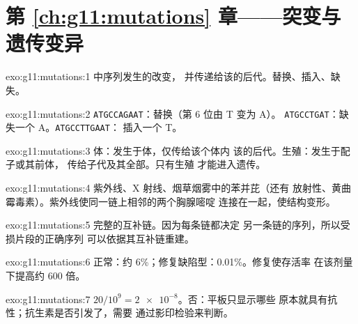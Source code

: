 \section*{第 \ref{ch:g11:mutations} 章——突变与遗传变异}

\begin{solution}{exo:g11:mutations:1}
 中序列发生的改变，
并传递给该的后代。替换、插入、缺失。
\end{solution}

\begin{solution}{exo:g11:mutations:2}
\texttt{ATGCCAGAAT}：替换（第 6 位由 T 变为 A）。
\texttt{ATGCCTGAT}：缺失一个 A。\texttt{ATGCCTTGAAT}：
插入一个 T。
\end{solution}

\begin{solution}{exo:g11:mutations:3}
体：发生于体，仅传给该个体内
该的后代。生殖：发生于配子或其前体，
传给子代及其全部。只有生殖
才能进入遗传。
\end{solution}

\begin{solution}{exo:g11:mutations:4}
紫外线、X 射线、烟草烟雾中的苯并芘（还有
放射性、黄曲霉毒素）。紫外线使同一链上相邻的两个胸腺嘧啶
连接在一起，使结构变形。
\end{solution}

\begin{solution}{exo:g11:mutations:5}
完整的互补链。因为每条链都决定
另一条链的序列，所以受损片段的正确序列
可以依据其互补链重建。
\end{solution}

\begin{solution}{exo:g11:mutations:6}
正常：约 6\%；修复缺陷型：0.01\%。修复使存活率
在该剂量下提高约 600 倍。
\end{solution}

\begin{solution}{exo:g11:mutations:7}
$20/10^9 = \num{2e-8}$。否：平板只显示哪些
原本就具有抗性；抗生素是否引发了，需要
通过影印检验来判断。
\end{solution}

